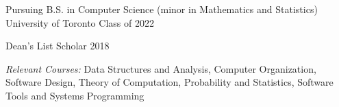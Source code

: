 
\begin{cventries}
  \cventry
    {Pursuing B.S. in Computer Science (minor in Mathematics and Statistics) } %
    {University of Toronto} %
    {} %
    {Class of 2022} %
    {
      \begin{cvitems} 
      	\item {Dean's List Scholar 2018}
         \item {\textit{Relevant Courses:} Data Structures and Analysis, Computer Organization, Software Design, Theory of Computation, Probability and Statistics, Software Tools and Systems Programming}
      \end{cvitems}
    }
\end{cventries}
